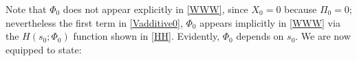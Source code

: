 \documentclass[12pt]{article}
\newtheorem{proposition}{Proposition}
\begin{document}
Note that  $\Phi_0$ does not appear explicitly in \eqref{WWW}, since $X_0 =0$ because $\Pi_0 =0$; nevertheless  the first term in \eqref{Vadditive0}, %
$\Phi_0$  appears implicitly in \eqref{WWW} via the  $H(s_0; \Phi_0)$ function shown in \eqref{HH}.
Evidently,  $\Phi_0$ depends on $s_0$. %
We are now equipped to state:




\end{document}
